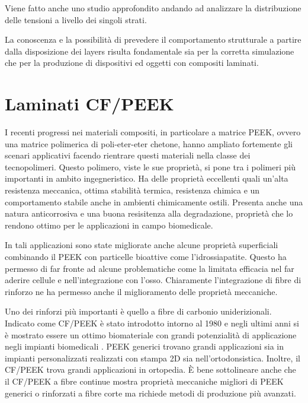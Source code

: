 \documentclass[a4paper,num-refs]{oup-contemporary}
\begin{document}
Viene fatto anche uno studio approfondito andando ad analizzare la distribuzione delle tensioni a livello dei singoli strati. 

La conoscenza e la possibilità di prevedere il comportamento strutturale a partire dalla disposizione dei layers risulta fondamentale sia per la corretta simulazione che per la produzione di dispositivi ed oggetti con compositi laminati. 


\section{Laminati CF/PEEK} 

I recenti progressi nei materiali compositi, in particolare a matrice PEEK, ovvero una matrice polimerica di poli-eter-eter chetone, hanno ampliato fortemente gli scenari applicativi facendo rientrare questi materiali nella classe dei tecnopolimeri. Questo polimero, viste le sue proprietà, si pone tra i polimeri più importanti in ambito ingegneristico. Ha delle proprietà eccellenti quali un'alta resistenza meccanica, ottima stabilità termica, resistenza chimica e un comportamento stabile anche in ambienti chimicamente ostili. Presenta anche una natura anticorrosiva e una buona resisitenza alla degradazione, proprietà che lo rendono ottimo per le applicazioni in campo biomedicale. 

In tali applicazioni sono state migliorate anche alcune proprietà superficiali combinando il PEEK con particelle bioattive come l'idrossiapatite. Questo ha permesso di far fronte ad alcune problematiche come la limitata efficacia nel far aderire cellule e nell'integrazione con l'osso.  Chiaramente l'integrazione di fibre di rinforzo ne ha permesso anche il miglioramento delle proprietà meccaniche. 

Uno dei rinforzi più importanti è quello a fibre di carbonio uniderizionali. Indicato come CF/PEEK è stato introdotto intorno al 1980 e negli ultimi anni si è mostrato essere un ottimo biomateriale con grandi potenzialità di applicazione negli impianti biomedicali \citep{Verma}.    
PEEK generici trovano grandi applicazioni sia in impianti personalizzati realizzati con stampa 2D sia nell'ortodonsistica. Inoltre, il CF/PEEK trova grandi applicazioni in ortopedia.  È bene sottolineare anche che il CF/PEEK a fibre continue mostra proprietà meccaniche migliori di PEEK generici o rinforzati a fibre corte ma richiede metodi di produzione più avanzati.
\end{document}
